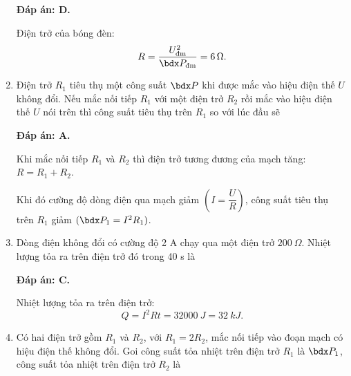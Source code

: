 \begin{enumerate}[label=\bfseries Câu \arabic*:]
{	}
	\loigiai
	{	\textbf{Đáp án: D.}
		
		Điện trở của bóng đèn:
		$$R=\dfrac{U_\text{đm}^2}{\calP_{\text{đm}}} = \SI{6}{\Omega}.$$
	}
	\item {}
	
	\cauhoi
	{Điện trở $R_1$ tiêu thụ một công suất $\calP$ khi được mắc vào hiệu điện thế $U$ không đổi. Nếu mắc nối tiếp $R_1$ với một điện trở $R_2$ rồi mắc vào hiệu điện thế $U$ nói trên thì công suất tiêu thụ trên $R_1$ so với lúc đầu sẽ
		
	}
	\loigiai
	{	\textbf{Đáp án: A.}
		
		Khi mắc nối tiếp $R_1$ và $R_2$ thì điện trở tương đương của mạch tăng: $R=R_1 + R_2$.
		
		Khi đó cường độ dòng điện qua mạch giảm $\left(I=\dfrac{U}{R}\right)$, công suất tiêu thụ trên $R_1$ giảm $(\calP_1 = I^2 R_1)$.
	}
	\item {}
	
	\cauhoi
	{Dòng điện không đổi có cường độ 2 A chạy qua một điện trở $\SI{200}{\Omega}$. Nhiệt lượng tỏa ra trên điện trở đó trong 40 s là
		
	}
	\loigiai
	{	\textbf{Đáp án: C.}
		
		Nhiệt lượng tỏa ra trên điện trở:
		$$Q=I^2 R t = \SI{32000}{J} = \SI{32}{kJ}.$$
	}
	\item {}
	
	\cauhoi
	{Có hai điện trở gồm $R_1$ và $R_2$, với $R_1=2R_2$, mắc nối tiếp vào đoạn mạch có hiệu điện thế không đổi. Goi công suất tỏa nhiệt trên điện trở $R_1$ là $\calP_1$, công suất tỏa nhiệt trên điện trở $R_2$ là
		
}
\end{enumerate}

